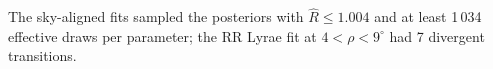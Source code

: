 The sky-aligned fits sampled the posteriors with $\hat R\leq1.004$ and at least 1\,034 effective draws per parameter; the RR Lyrae fit at $4<\rho<9^\circ$ had 7 divergent transitions.
